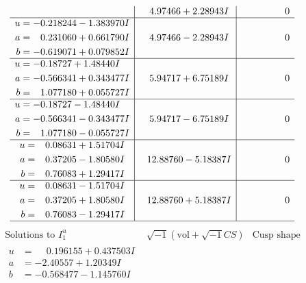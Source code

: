 \documentclass[1p]{elsarticle_modified}
\theoremstyle{definition}
\newcommand{\I}{\sqrt{-1}}
\begin{document}
$$\begin{array}{c|c|c}
 & \phantom{-}4.97466 + 2.28943 I & \phantom{-0.000000 } 0 \\ \hline\begin{aligned}
u &= -0.218244 - 1.383970 I \\
a &= \phantom{-}0.231060 + 0.661790 I \\
b &= -0.619071 + 0.079852 I\end{aligned}
 & \phantom{-}4.97466 - 2.28943 I & \phantom{-0.000000 } 0 \\ \hline\begin{aligned}
u &= -0.18727 + 1.48440 I \\
a &= -0.566341 + 0.343477 I \\
b &= \phantom{-}1.077180 + 0.055727 I\end{aligned}
 & \phantom{-}5.94717 + 6.75189 I & \phantom{-0.000000 } 0 \\ \hline\begin{aligned}
u &= -0.18727 - 1.48440 I \\
a &= -0.566341 - 0.343477 I \\
b &= \phantom{-}1.077180 - 0.055727 I\end{aligned}
 & \phantom{-}5.94717 - 6.75189 I & \phantom{-0.000000 } 0 \\ \hline\begin{aligned}
u &= \phantom{-}0.08631 + 1.51704 I \\
a &= \phantom{-}0.37205 - 1.80580 I \\
b &= \phantom{-}0.76083 + 1.29417 I\end{aligned}
 & \phantom{-}12.88760 - 5.18387 I & \phantom{-0.000000 } 0 \\ \hline\begin{aligned}
u &= \phantom{-}0.08631 - 1.51704 I \\
a &= \phantom{-}0.37205 + 1.80580 I \\
b &= \phantom{-}0.76083 - 1.29417 I\end{aligned}
 & \phantom{-}12.88760 + 5.18387 I & \phantom{-0.000000 } 0\\
 \hline 
 \end{array}$$\newpage$$\begin{array}{c|c|c}  
\text{Solutions to }I^u_{1}& \I (\text{vol} + \sqrt{-1}CS) & \text{Cusp shape}\\
 \hline 
\begin{aligned}
u &= \phantom{-}0.196155 + 0.437503 I \\
a &= -2.40557 + 1.20349 I \\
b &= -0.568477 - 1.145760 I\end{aligned}

\end{array}$$
\end{document}
